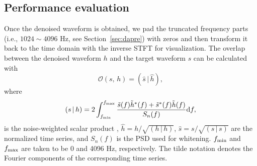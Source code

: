 \documentclass[preprint,12pt]{elsarticle}
\begin{document}
\subsection{Performance evaluation}\label{sec:perf}
Once the denoised waveform is obtained, we pad the truncated frequency parts (i.e., $1024\sim 4096$ Hz, see Section~\ref{sec:dapre}) with zeros and then transform it back to the time domain with the inverse STFT for visualization. 
The overlap \cite{abbott2021gwtc} between the denoised waveform $h$ and the target waveform $s$ can be calculated with
\begin{equation}
\mathcal{O}(s,\,h)=(\hat{s}\,|\,\hat{h}),
\end{equation}
where
\begin{equation}
(s\,|\,h)=2\int_{f_{\rm min}}^{f_{\rm max}}\frac{\tilde{s}(f)
\tilde{h}^*(f)+\tilde{s}^*(f)\tilde{h}(f)}{S_n(f)}{\rm d}f,
\end{equation}
is the noise-weighted scalar product \cite{finn1992detection},
$\hat{h}=h/\sqrt{(h\,|\,h)}$, 
$\hat{s}=s/\sqrt{(s\,|\,s)}$
are the normalized time series, and $S_{n}(f)$ is the PSD used for whitening.
$f_{\rm min}$ and $f_{\rm max}$ are taken to be 0 and 4096 Hz, respectively. 
The tilde notation denotes the Fourier components of the corresponding time series.
\end{document}
